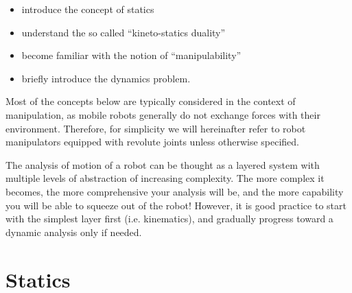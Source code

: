 \begin{itemize}
\item introduce the concept of statics
\item understand the so called ``kineto-statics duality''
\item become familiar with the notion of ``manipulability''
\item briefly introduce the dynamics problem.
\end{itemize}

Most of the concepts below are typically considered in the context of manipulation, as mobile robots generally do not exchange forces with their environment.
Therefore, for simplicity we will hereinafter refer to robot manipulators equipped with revolute joints unless otherwise specified.

\begin{mdframed}
\noindent The analysis of motion of a robot can be thought as a layered system with multiple levels of abstraction of increasing complexity.
The more complex it becomes, the more comprehensive your analysis will be, and the more capability you will be able to squeeze out of the robot!
However, it is good practice to start with the simplest layer first (i.e. kinematics), and gradually progress toward a dynamic analysis only if needed.
\end{mdframed}

\section{Statics}

